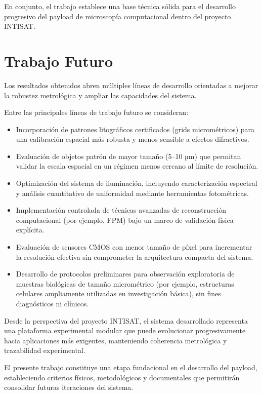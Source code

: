 En conjunto, el trabajo establece una base técnica sólida para el desarrollo progresivo del payload de microscopía computacional dentro del proyecto INTISAT.
\section{Trabajo Futuro}

Los resultados obtenidos abren múltiples líneas de desarrollo orientadas a mejorar la robustez metrológica y ampliar las capacidades del sistema.

Entre las principales líneas de trabajo futuro se consideran:

\begin{itemize}
    \item Incorporación de patrones litográficos certificados (grids micrométricos) para una calibración espacial más robusta y menos sensible a efectos difractivos.

    \item Evaluación de objetos patrón de mayor tamaño (5–10 µm) que permitan validar la escala espacial en un régimen menos cercano al límite de resolución.

    \item Optimización del sistema de iluminación, incluyendo caracterización espectral y análisis cuantitativo de uniformidad mediante herramientas fotométricas.

    \item Implementación controlada de técnicas avanzadas de reconstrucción computacional (por ejemplo, FPM) bajo un marco de validación física explícita.

    \item Evaluación de sensores CMOS con menor tamaño de píxel para incrementar la resolución efectiva sin comprometer la arquitectura compacta del sistema.

    \item Desarrollo de protocolos preliminares para observación exploratoria de muestras biológicas de tamaño micrométrico (por ejemplo, estructuras celulares ampliamente utilizadas en investigación básica), sin fines diagnósticos ni clínicos.
\end{itemize}

Desde la perspectiva del proyecto INTISAT, el sistema desarrollado representa una plataforma experimental modular que puede evolucionar progresivamente hacia aplicaciones más exigentes, manteniendo coherencia metrológica y trazabilidad experimental.

El presente trabajo constituye una etapa fundacional en el desarrollo del payload, estableciendo criterios físicos, metodológicos y documentales que permitirán consolidar futuras iteraciones del sistema.
